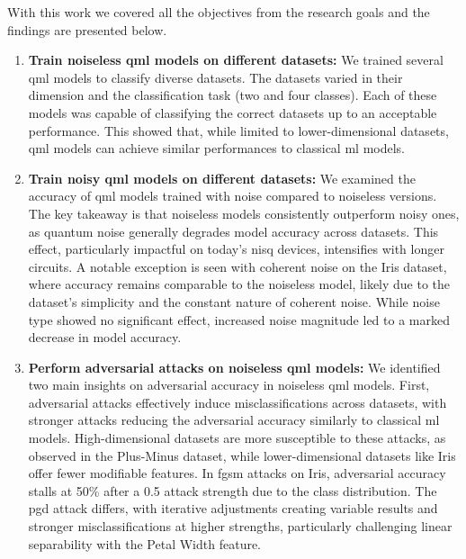 With this work we covered all the objectives from the research
goals and the findings are presented below. \

\begin{enumerate}
    \item \textbf{Train noiseless \ac{qml} models on different datasets:}
        We trained several \ac{qml} models to classify diverse datasets.
        The datasets varied in their dimension and the classification
        task (two and four classes). Each of these models was capable of
        classifying the correct datasets up to an acceptable performance.
        This showed that, while limited to lower-dimensional datasets,
        \ac{qml} models can achieve similar performances to classical
        \ac{ml} models. \
    \item \textbf{Train noisy \ac{qml} models on different datasets:}
        We examined the accuracy of \ac{qml} models trained
        with noise compared to noiseless versions. The key takeaway is
        that noiseless models consistently outperform noisy ones, as
        quantum noise generally degrades model accuracy across datasets.
        This effect, particularly impactful on today's \ac{nisq} devices,
        intensifies with longer circuits. A notable exception is seen with
        coherent noise on the Iris dataset, where accuracy remains comparable
        to the noiseless model, likely due to the dataset's simplicity and the
        constant nature of coherent noise. While noise type showed no significant
        effect, increased noise magnitude led to a marked decrease in model accuracy. \
    \item \textbf{Perform adversarial attacks on noiseless \ac{qml} models:}
        We identified two main insights on adversarial accuracy in noiseless
        \ac{qml} models. First, adversarial attacks effectively induce
        misclassifications across datasets, with stronger attacks reducing the
        adversarial accuracy similarly to classical \ac{ml} models. High-dimensional
        datasets are more susceptible to these attacks, as observed in the Plus-Minus
        dataset, while lower-dimensional datasets like Iris offer fewer modifiable
        features. In \ac{fgsm} attacks on Iris, adversarial accuracy stalls at 50\%
        after a 0.5 attack strength due to the class distribution. The \ac{pgd}
        attack differs, with iterative adjustments creating variable results
        and stronger misclassifications at higher strengths, particularly
        challenging linear separability with the Petal Width feature. \

\end{enumerate}
